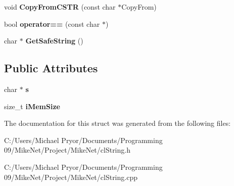 \begin{DoxyCompactItemize}
\item 
\hypertarget{struct__cl_string_a274781f82a352b60307a4af37b7d53ac}{
void {\bfseries CopyFromCSTR} (const char $\ast$CopyFrom)}
\label{struct__cl_string_a274781f82a352b60307a4af37b7d53ac}

\item 
\hypertarget{struct__cl_string_a60919b9754c47263d36064b0768813f1}{
bool {\bfseries operator==} (const char $\ast$)}
\label{struct__cl_string_a60919b9754c47263d36064b0768813f1}

\item 
\hypertarget{struct__cl_string_a917fdf85dad365519ba890335ffec94f}{
char $\ast$ {\bfseries GetSafeString} ()}
\label{struct__cl_string_a917fdf85dad365519ba890335ffec94f}

\end{DoxyCompactItemize}
\subsection*{Public Attributes}
\begin{DoxyCompactItemize}
\item 
\hypertarget{struct__cl_string_ac468049197b354189c5df2c8bc2788b4}{
char $\ast$ {\bfseries s}}
\label{struct__cl_string_ac468049197b354189c5df2c8bc2788b4}

\item 
\hypertarget{struct__cl_string_a8275d56269a87d8dc010aba11efeee90}{
size\_\-t {\bfseries iMemSize}}
\label{struct__cl_string_a8275d56269a87d8dc010aba11efeee90}

\end{DoxyCompactItemize}


The documentation for this struct was generated from the following files:\begin{DoxyCompactItemize}
\item 
C:/Users/Michael Pryor/Documents/Programming 09/MikeNet/Project/MikeNet/clString.h\item 
C:/Users/Michael Pryor/Documents/Programming 09/MikeNet/Project/MikeNet/clString.cpp\end{DoxyCompactItemize}
